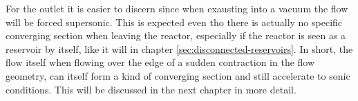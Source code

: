 	For the outlet it is easier to discern since when exausting into a vacuum the flow will be forced supersonic.
	This is expected even tho there is actually no specific converging section when leaving the reactor, especially if the reactor is seen as a reservoir by itself, like it will in chapter \ref{sec:disconnected-reservoirs}.
	In short, the flow itself when flowing over the edge of a sudden contraction in the flow geometry, can itself form a kind of converging section and still accelerate to sonic conditions.
	This will be discussed in the next chapter in more detail.

